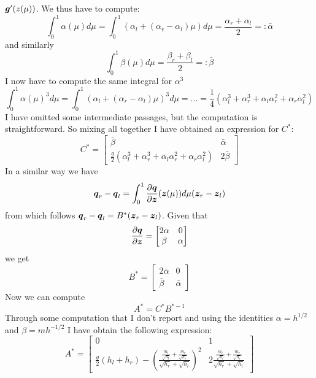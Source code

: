 \documentclass[oneside,12pt]{book}  %
\theoremstyle{plain}
\theoremstyle{definition}
\theoremstyle{remark}
\numberwithin{equation}{chapter} %
\begin{document}
$\gg'(\\z(\mu))$. We thus have to compute:
\begin{equation}
  \label{eq:alpha_integral}
  \int_0^1\alpha(\mu)d\mu=\int_0^1(\alpha_l+(\alpha_r-\alpha_l)\mu)d\mu=\frac{\alpha_r+\alpha_l}{2}=:\bar{\alpha}
\end{equation}
and similarly
\begin{equation}
  \label{eq:beta_integral}
  \int_0^1\beta(\mu)d\mu=\frac{\beta_r+\beta_l}{2}=:\bar{\beta}
\end{equation}
I now have to compute the same integral for $\alpha^3$
\begin{equation}
  \label{eq:alpha_cubic_integral}
  \int_0^1\alpha(\mu)^3d\mu=\int_0^1(\alpha_l+(\alpha_r-\alpha_l)\mu)^3d\mu=...=
  \frac{1}{4}(\alpha_l^3+\alpha_r^3+\alpha_l\alpha_r^2+\alpha_r\alpha_l^2)
\end{equation}
I have omitted some intermediate passages, but the computation is
straightforward. So mixing all together I have obtained an expression
for $C^*$:
\begin{equation}
  \label{eq:c_matrix}
  C^*=\begin{bmatrix} \bar{\beta} & \bar{\alpha} \\ \frac{g}{2} (\alpha_l^3+\alpha_r^3+\alpha_l\alpha_r^2+\alpha_r\alpha_l^2)
  & 2\bar{\beta} \end{bmatrix}
\end{equation}
\newline
In a similar way we have $$\qq_r-\qq_l=\int_0^1\frac{\partial
  \qq}{\partial \zz}(\zz(\mu))d\mu(\zz_r-\zz_l)$$
from which follows $\qq_r-\qq_l=B^*(\zz_r-\zz_l)$. Given
that $$\frac{\partial \qq}{\partial \zz}=\begin{bmatrix} 2\alpha & 0\\
  \beta & \alpha \end{bmatrix}$$ we get
\begin{equation}
  \label{eq:b_matrix}
  B^*=\begin{bmatrix} 2\bar\alpha & 0\\
  \bar\beta & \bar\alpha \end{bmatrix}
\end{equation}
Now we can compute $$A^*=C^*B^{*-1}$$ Through some computation that I
don't report and using the identities $\alpha=h^{1/2}$ and
$\beta=mh^{-1/2}$ I have obtain the following expression:
\begin{equation}
 \label{eq:a_matrix}
  A^*=\begin{bmatrix} 0 & 1\\
  \frac{g}{2}(h_l+h_r)- \left
    (\frac{\frac{m_l}{\sqrt{h_l}}+\frac{m_r}{\sqrt{h_r}}
    }{\sqrt{h_r}+\sqrt{h_l}} \right )^2& 
  2\frac{\frac{m_l}{\sqrt{h_l}}+\frac{m_r}{\sqrt{h_r}} }{\sqrt{h_r}+\sqrt{h_l}} \end{bmatrix}
\end{equation}
\end{document}
